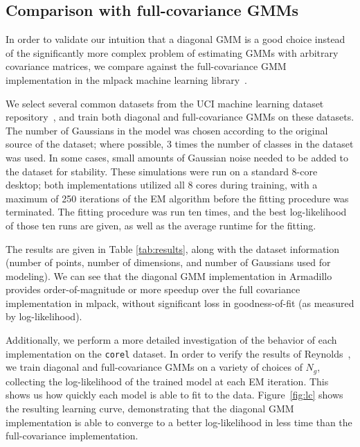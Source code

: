 \subsection{Comparison with full-covariance GMMs}


In order to validate our intuition that a diagonal GMM is a good choice instead
of the significantly more complex problem of estimating GMMs with arbitrary
covariance matrices, we compare against the full-covariance GMM implementation
in the mlpack machine learning library~\cite{Curtin_2013}.

We select several common datasets from the UCI machine learning dataset
repository~\cite{Lichman_2013}, and train both diagonal and full-covariance
GMMs on these datasets.  The number of Gaussians in the model was chosen
according to the original source of the dataset; where possible, 3 times the
number of classes in the dataset was used.  In some cases, small amounts of
Gaussian noise needed to be added to the dataset for stability.
These simulations were run on a standard 8-core desktop; both implementations
utilized all 8 cores during training, with a maximum of 250 iterations of the EM
algorithm before the fitting procedure was terminated.  The fitting procedure
was run ten times, and the best log-likelihood of those ten runs are given, as
well as the average runtime for the fitting.

The results are given in Table \ref{tab:results}, along with the dataset
information (number of points, number of dimensions, and number of Gaussians
used for modeling).  We can see that the diagonal GMM implementation in
Armadillo provides order-of-magnitude or more speedup over the full covariance
implementation in mlpack, without significant loss in goodness-of-fit (as
measured by log-likelihood).

Additionally, we perform a more detailed investigation of the behavior of each
implementation on the {\tt corel} dataset.  In order to verify the results of
Reynolds~\cite{Reynolds_2000}, we train diagonal and full-covariance GMMs on a
variety of choices of $N_g$, collecting the log-likelihood of the trained model
at each EM iteration.  This shows us how quickly each model is able to fit to
the data.  Figure~\ref{fig:lc} shows the resulting learning curve, demonstrating
that the diagonal GMM implementation is able to converge to a better
log-likelihood in less time than the full-covariance implementation.

